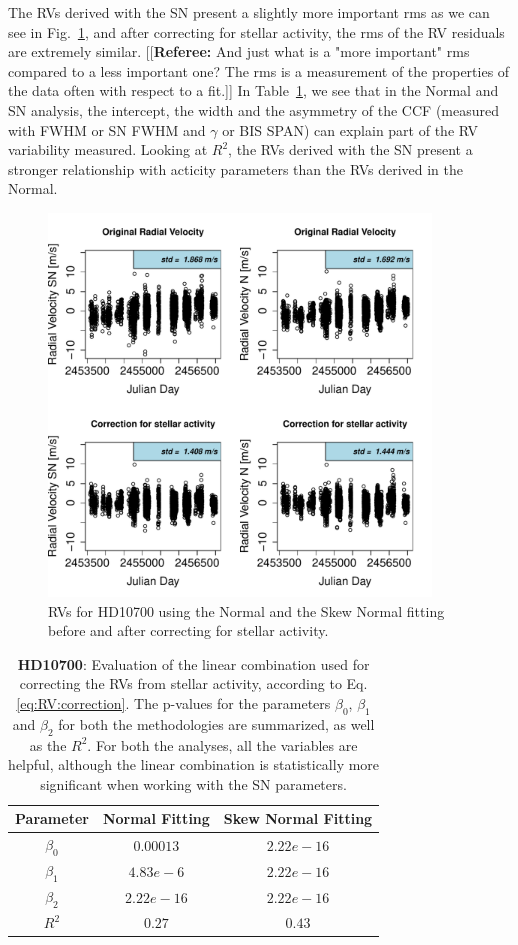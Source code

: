 \documentclass[11pt, oneside]{article}
\newcommand{\comment}[1]{{\color{red}[[\textbf{Referee: }#1]]}}
\begin{document}
The RVs derived with the SN present a slightly more important rms as we can see in Fig.~\ref{fig:Tau:correctionRV}, and after correcting for stellar activity, the rms of the RV residuals are extremely similar. 
\comment{And just what is a "more important" rms compared to a less important one? The rms is a measurement of the properties of the data often with respect to a fit.}
In Table~\ref{table:Tau:test}, we see that in the Normal and SN analysis, the intercept, the width and the asymmetry of the CCF (measured with FWHM or SN FWHM and $\gamma$ or BIS SPAN) can explain part of the RV variability measured. Looking at $R^2$, the RVs derived with the SN present a stronger relationship with acticity parameters than the RVs derived in the Normal.
%
\begin{figure}[htbp]
   \centering
\includegraphics[height = 4in]{HD10700_[3]CorrectionActivity_RadialVelocity_vs_time.pdf} 
   \caption{RVs for HD10700 using the Normal and the Skew Normal fitting before and after correcting for stellar activity.}
   \label{fig:Tau:correctionRV}
\end{figure}
%
\begin{table}[!t]
\begin{tabular}{|c|c|c|}
\hline
Parameter          & Normal Fitting         &   Skew Normal Fitting \\
\hline
$\beta_{0}$            &    $0.00013$    & $2.22e-16$ \\
\hline
$\beta_{1}$            &    $4.83e-6$    & $2.22e-16$ \\
\hline
$\beta_{2}$            &     $2.22e-16$   &  $ 2.22e-16 $ \\
\hline
$R^{2}$      &     $0.27$    &  $0.43$   \\
\hline
\end{tabular}
\caption{\textbf{HD10700}: Evaluation of the linear combination used for correcting the RVs from stellar activity, according to Eq. \ref{eq:RV:correction}. The p-values for the parameters  $\beta_{0}$, $\beta_{1}$ and $\beta_{2}$ for both the methodologies are summarized, as well as the $R^2$. For both the analyses, all the variables are helpful, although the linear combination is statistically more significant when working with the SN parameters.}
\label{table:Tau:test}
\end{table}
\end{document}
